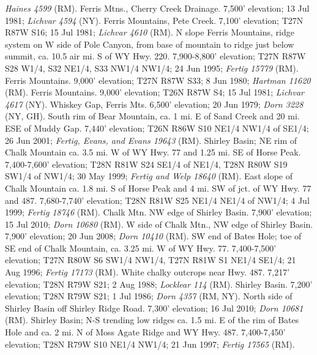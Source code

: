 \textit{Haines 4599} (RM).
Ferris Mtns., Cherry Creek Drainage. 7,500' elevation; 13 Jul 1981;
\textit{Lichvar 4594} (NY).
Ferris Mountains, Pete Creek. 7,100' elevation; T27N R87W S16; 15 Jul 1981;
\textit{Lichvar 4610} (RM).
N slope Ferris Mountains, ridge system on W side of Pole Canyon, from base of
mountain to ridge just below summit, ca. 10.5 air mi. S of WY Hwy. 220.
7,900-8,800' elevation; T27N R87W S28 W1/4, S32 NE1/4, S33 NW1/4 NW1/4;
24 Jun 1995; \textit{Fertig 15779} (RM).
Ferris Mountains. 9,000' elevation; T27N R87W S33; 8 Jun 1980;
\textit{Hartman 11620} (RM).
Ferris Mountains. 9,000' elevation; T26N R87W S4; 15 Jul 1981;
\textit{Lichvar 4617} (NY).
Whiskey Gap, Ferris Mts. 6,500' elevation; 20 Jun 1979;
\textit{Dorn 3228} (NY, GH).
South rim of Bear Mountain, ca. 1 mi. E of Sand Creek and 20 mi. ESE of
Muddy Gap. 7,440' elevation; T26N R86W S10 NE1/4 NW1/4 of SE1/4; 26 Jun 2001;
\textit{Fertig, Evans, and Evans 19643} (RM).
Shirley Basin; NE rim of Chalk Mountain ca. 3.5 mi. W of WY Hwy. 77 and 1.25
mi. SE of Horse Peak. 7,400-7,600' elevation; T28N R81W S24 SE1/4 of NE1/4,
T28N R80W S19 SW1/4 of NW1/4; 30 May 1999; \textit{Fertig and Welp 18640} (RM).
East slope of Chalk Mountain ca. 1.8 mi. S of Horse Peak and 4 mi. SW of
jct. of WY Hwy. 77 and 487. 7,680-7,740' elevation; T28N R81W S25 NE1/4 NE1/4
of NW1/4; 4 Jul 1999; \textit{Fertig 18746} (RM).
Chalk Mtn. NW edge of Shirley Basin. 7,900' elevation; 15 Jul 2010;
\textit{Dorn 10680} (RM).
W side of Chalk Mtn., NW edge of Shirley Basin. 7,900' elevation; 20 Jun 2008;
\textit{Dorn 10410} (RM).
SW end of Bates Hole; toe of SE end of Chalk Mountain, ca. 3.25 mi. W of WY
Hwy. 77. 7,400-7,500' elevation; T27N R80W S6 SW1/4 NW1/4,
T27N R81W S1 NE1/4 SE1/4; 21 Aug 1996; \textit{Fertig 17173} (RM).
White chalky outcrops near Hwy. 487. 7,217' elevation; T28N R79W S21;
2 Aug 1988; \textit{Locklear 114} (RM).
Shirley Basin. 7,200' elevation; T28N R79W S21; 1 Jul 1986;
\textit{Dorn 4357} (RM, NY).
North side of Shirley Basin off Shirley Ridge Road. 7,300' elevation;
16 Jul 2010; \textit{Dorn 10681} (RM).
Shirley Basin; N-S trending low ridges ca. 1.5 mi. E of the rim of Bates Hole
and ca. 2 mi. N of Moss Agate Ridge and WY Hwy. 487. 7,400-7,450' elevation;
T28N R79W S10 NE1/4 NW1/4; 21 Jun 1997; \textit{Fertig 17565} (RM).
